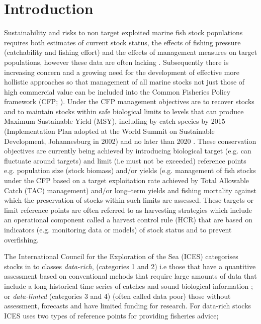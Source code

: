 \documentclass[preprint,review,12pt]{elsarticle}
\begin{document}
\section{Introduction}
\label{S:1}
Sustainability and risks to non target exploited marine fish stock populations requires both estimates of current stock status, the effects of fishing pressure (catchability and fishing effort) and the effects of management measures on target populations, however these data are often lacking \cite{doi:10.1016/j.icesjms.2006.03.028}.  Subsequently there is increasing concern and a growing need for the development of effective more hollistic approaches so that management of all marine stocks not just those of high commercial value can be included into the Common Fisheries Policy framework (CFP; \cite{european2013regulation}). Under the CFP management objectives are to recover stocks and to maintain stocks within safe biological limits to levels that can produce Maximum Sustainable Yield (MSY), including by-catch species by 2015 (Implementation Plan adopted at the World Summit on Sustainable Development, Johannesburg in 2002) and no later than 2020 \cite{summit2002world} \cite{fao2003world}. These conservation objectives are currently being achieved by introducing biological target (e.g. can fluctuate around targets) and limit (i.e must not be exceeded) reference points e.g. population size (stock biomass) and/or yields (e.g. management of fish stocks under the CFP based on a target exploitation rate achieved by Total Allowable Catch (TAC) management) and/or long–term yields and fishing mortality against which the preservation of stocks within such limits are assessed. These targets or limit reference points are often referred to as harvesting strategies which include an operational component called a harvest control rule (HCR) that are based on indicators (e.g. monitoring data or models) of stock status and to prevent overfishing. 

The International Council for the Exploration of the Sea (ICES) categorises stocks in to classes \emph{data-rich}, (categories 1 and 2) i.e those that have a quantitive assessment based on conventional mehods that require large amounts of data that include a long historical time series of catches and sound biological information \cite{bentley2015data}; or \emph{data-limted} \cite{costello2012status}(categories 3 and 4) (often called data poor) those without assessment, forecasts and have limited funding for research. For data-rich stocks ICES uses two types of reference points for providing fisheries advice; 
\end{document}
